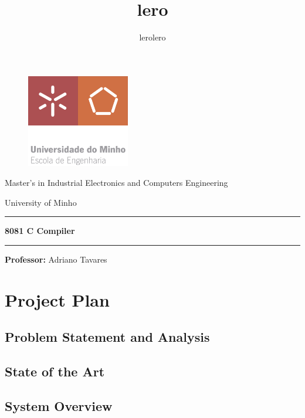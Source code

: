 \documentclass[11pt]{article}
\title{lero}
\author{lerolero}
\begin{document}
    \begin{titlepage}
        \centering
        \begin{figure}[h!]  %
            \centering
            \includegraphics[width=0.4\textwidth]{assets/ENG-EN.png}  %
            \label{fig:sample}
        \end{figure}

       
        Master’s in Industrial Electronics and Computers Engineering
        \Large

        University of Minho
        \rule{\textwidth}{0.4pt}
        \textbf{8081 C Compiler}
        \rule{\textwidth}{0.4pt}
        \vspace{5in}

        
        \textbf{Professor:}
        Adriano Tavares

    \end{titlepage}
    
    \newpage
    \tableofcontents

    \newpage
    
    \newpage
    \section{Project Plan}
    \newpage
    \subsection{Problem Statement and Analysis}
    
    \subsection{State of the Art}
    
    \subsection{System Overview}
    
\end{document}
